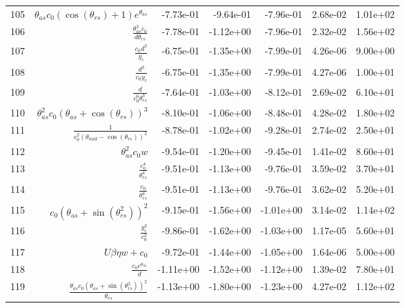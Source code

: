 \begin{tabularx}{\textwidth}{lRRRRRl}
105  &  $ \theta_{as} c_{0} \left(\cos{\left(\theta_{rs} \right)} + 1\right) e^{\theta_{as}} $  &  -7.73e-01  &  -9.64e-01  &  -7.96e-01  &  2.68e-02  &  1.01e+02  \\ 
106  &  $ \displaystyle\frac{\theta_{as}^{3} c_{0}}{d \theta_{rs}} $  &  -7.78e-01  &  -1.12e+00  &  -7.96e-01  &  2.32e-02  &  1.56e+02  \\ 
107  &  $ \displaystyle\frac{c_{0} d^{3}}{y_c} $  &  -6.75e-01  &  -1.35e+00  &  -7.99e-01  &  4.26e-06  &  9.00e+00  \\ 
108  &  $ \displaystyle\frac{d^{3}}{c_{0} y_c} $  &  -6.75e-01  &  -1.35e+00  &  -7.99e-01  &  4.27e-06  &  1.00e+01  \\ 
109  &  $ \displaystyle\frac{d}{c_{0}^{6} \theta_{rs}^{3}} $  &  -7.64e-01  &  -1.03e+00  &  -8.12e-01  &  2.69e-02  &  6.10e+01  \\ 
110  &  $ \theta_{as}^{2} c_{0} \left(\theta_{as} + \cos{\left(\theta_{rs} \right)}\right)^{3} $  &  -8.10e-01  &  -1.06e+00  &  -8.48e-01  &  4.28e-02  &  1.80e+02  \\ 
111  &  $ \displaystyle\frac{1}{c_{0}^{2} \left(\theta_{mid} - \cos{\left(\theta_{rs} \right)}\right)^{2}} $  &  -8.78e-01  &  -1.02e+00  &  -9.28e-01  &  2.74e-02  &  2.50e+01  \\ 
112  &  $ \theta_{as}^{2} c_{0} w $  &  -9.54e-01  &  -1.20e+00  &  -9.45e-01  &  1.41e-02  &  8.60e+01  \\ 
113  &  $ \displaystyle\frac{c_{0}^{4}}{\theta_{rs}^{4}} $  &  -9.51e-01  &  -1.13e+00  &  -9.76e-01  &  3.59e-02  &  3.70e+01  \\ 
114  &  $ \displaystyle\frac{c_{0}}{\theta_{rs}^{4}} $  &  -9.51e-01  &  -1.13e+00  &  -9.76e-01  &  3.62e-02  &  5.20e+01  \\ 
115  &  $ c_{0} \left(\theta_{as} + \sin{\left(\theta_{rs}^{2} \right)}\right)^{2} $  &  -9.15e-01  &  -1.56e+00  &  -1.01e+00  &  3.14e-02  &  1.14e+02  \\ 
116  &  $ \displaystyle\frac{y_c^{3}}{c_{0}^{3}} $  &  -9.86e-01  &  -1.62e+00  &  -1.03e+00  &  1.17e-05  &  5.60e+01  \\ 
117  &  $ U \beta \eta w + c_{0} $  &  -9.72e-01  &  -1.44e+00  &  -1.05e+00  &  1.64e-06  &  5.00e+00  \\ 
118  &  $ \displaystyle\frac{c_{0} e^{\theta_{as}}}{d} $  &  -1.11e+00  &  -1.52e+00  &  -1.12e+00  &  1.39e-02  &  7.80e+01  \\ 
119  &  $ \displaystyle\frac{\theta_{as} c_{0} \left(\theta_{as} + \sin{\left(\theta_{rs}^{2} \right)}\right)^{2}}{\theta_{rs}} $  &  -1.13e+00  &  -1.80e+00  &  -1.23e+00  &  4.27e-02  &  1.12e+02  \\ 

\end{tabularx}
